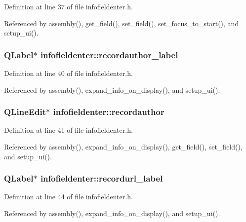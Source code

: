 Definition at line 37 of file infofieldenter.h.

Referenced by assembly(), get\_\-field(), set\_\-field(), set\_\-focus\_\-to\_\-start(), and setup\_\-ui().
\subsubsection{\setlength{\rightskip}{0pt plus 5cm}QLabel$\ast$ {\bf infofieldenter::recordauthor\_\-label}\hspace{0.3cm}{\tt  [private]}}\label{classinfofieldenter_88635e70eb97d755fe51097aab986404}




Definition at line 40 of file infofieldenter.h.

Referenced by assembly(), expand\_\-info\_\-on\_\-display(), and setup\_\-ui().
\subsubsection{\setlength{\rightskip}{0pt plus 5cm}QLine\-Edit$\ast$ {\bf infofieldenter::recordauthor}\hspace{0.3cm}{\tt  [private]}}\label{classinfofieldenter_bbb59d8a51ad8f9392e59644a6222032}




Definition at line 41 of file infofieldenter.h.

Referenced by assembly(), expand\_\-info\_\-on\_\-display(), get\_\-field(), set\_\-field(), and setup\_\-ui().
\subsubsection{\setlength{\rightskip}{0pt plus 5cm}QLabel$\ast$ {\bf infofieldenter::recordurl\_\-label}\hspace{0.3cm}{\tt  [private]}}\label{classinfofieldenter_f886fba61763496c28db9d272d50221f}




Definition at line 44 of file infofieldenter.h.

Referenced by assembly(), expand\_\-info\_\-on\_\-display(), and setup\_\-ui().
